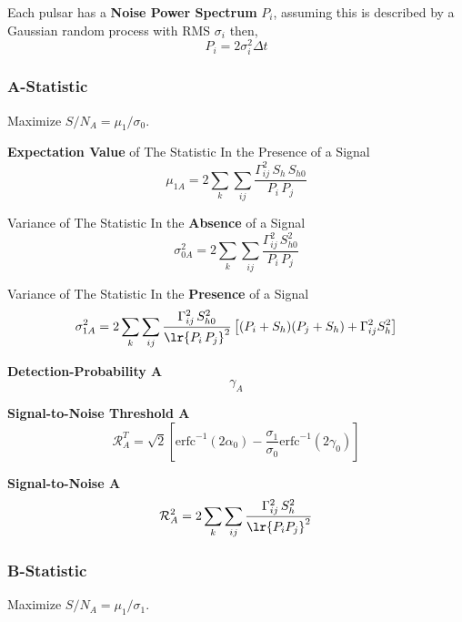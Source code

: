 \documentclass[10pt, oneside, onecolumn]{article}   	%
\newcommand\erfcinv[1]{\mathrm{erfc}^{-1}\left(#1\right)}
\newcommand\snr{\mathcal{R}}
\newcommand\pulsarsum{\sum_k \sum_{ij}}
\begin{document}
    Each pulsar has a \textbf{Noise Power Spectrum} $P_i$, assuming this is described by a Gaussian random process with RMS $\sigma_i$ then,
    \begin{equation}
    P_i = 2\sigma_i^2 \Delta t
    \end{equation}

    \subsubsection{A-Statistic}
    Maximize $S/N_A = \mu_1 / \sigma_0$.

    \noindent \textbf{Expectation Value} of The Statistic In the Presence of a Signal
    \begin{equation}
    \mu_{1A} = 2 \pulsarsum \frac{\Gamma_{ij}^2 \, S_h \, S_{h0}}{P_i \, P_j}
    \end{equation}

    \noindent Variance of The Statistic In the \textbf{Absence} of a Signal
    \begin{equation}
    \sigma_{0A}^2 = 2 \pulsarsum \frac{\Gamma_{ij}^2 \, S_{h0}^2}{P_i \, P_j}
    \end{equation}

    \noindent Variance of The Statistic In the \textbf{Presence} of a Signal
    \begin{equation}
    \sigma_{1A}^2 = 2 \pulsarsum \frac{\Gamma_{ij}^2 \, S_{h0}^2}{\lr{P_i \, P_j}^2} \left[(P_i + S_h)(P_j + S_h) + \Gamma_{ij}^2 S_h^2\right]
    \end{equation}

    \noindent \textbf{Detection-Probability A}
    \begin{equation}
    \gamma_A
    \end{equation}

    \noindent \textbf{Signal-to-Noise Threshold A}
    \begin{equation}
    \label{eq:snr_thresh_a}
    \snr_A^T = \sqrt{2} \left[ \erfcinv{2\alpha_0} - \frac{\sigma_1}{\sigma_0} \erfcinv{2\gamma_0} \right]
    \end{equation}

    \noindent \textbf{Signal-to-Noise A}
    \begin{equation}
    \label{eq:snr_a}
    \snr_A^2 = 2 \pulsarsum \frac{\Gamma_{ij}^2 \, S_h^2}{\lr{P_i P_j}^2}
    \end{equation}

    \subsubsection{B-Statistic}
    Maximize $S/N_A = \mu_1 / \sigma_1$.
\end{document}
